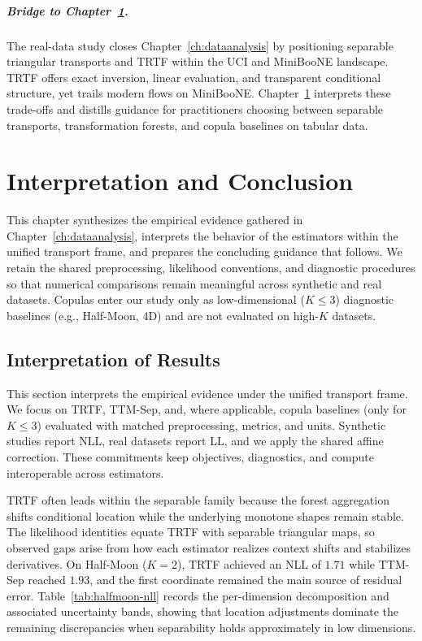 \documentclass[11pt,a4paper,twoside]{book}\usepackage[]{graphicx}\usepackage[]{xcolor}
\begin{document}
\paragraph{Bridge to Chapter~\ref{ch:conclusion}.} The real-data study closes Chapter~\ref{ch:dataanalysis} by positioning separable triangular transports and TRTF within the UCI and MiniBooNE landscape. TRTF offers exact inversion, linear evaluation, and transparent conditional structure, yet trails modern flows on MiniBooNE. Chapter~\ref{ch:conclusion} interprets these trade-offs and distills guidance for practitioners choosing between separable transports, transformation forests, and copula baselines on tabular data.





\chapter{Interpretation and Conclusion}\label{ch:conclusion}

This chapter synthesizes the empirical evidence gathered in Chapter~\ref{ch:dataanalysis}, interprets the behavior of the estimators within the unified transport frame, and prepares the concluding guidance that follows. We retain the shared preprocessing, likelihood conventions, and diagnostic procedures so that numerical comparisons remain meaningful across synthetic and real datasets. Copulas enter our study only as low-dimensional ($K\!\le\!3$) diagnostic baselines (e.g., Half-Moon, 4D) and are not evaluated on high-$K$ datasets.

\section{Interpretation of Results}\label{sec:interpretation-results}
This section interprets the empirical evidence under the unified transport frame. We focus on TRTF, TTM-Sep, and, where applicable, copula baselines (only for $K\!\le\!3$) evaluated with matched preprocessing, metrics, and units. Synthetic studies report NLL, real datasets report LL, and we apply the shared affine correction. These commitments keep objectives, diagnostics, and compute interoperable across estimators.

TRTF often leads within the separable family because the forest aggregation shifts conditional location while the underlying monotone shapes remain stable. The likelihood identities equate TRTF with separable triangular maps, so observed gaps arise from how each estimator realizes context shifts and stabilizes derivatives. On Half-Moon ($K=2$), TRTF achieved an NLL of $1.71$ while TTM-Sep reached $1.93$, and the first coordinate remained the main source of residual error. Table~\ref{tab:halfmoon-nll} records the per-dimension decomposition and associated uncertainty bands, showing that location adjustments dominate the remaining discrepancies when separability holds approximately in low dimensions.
\end{document}
